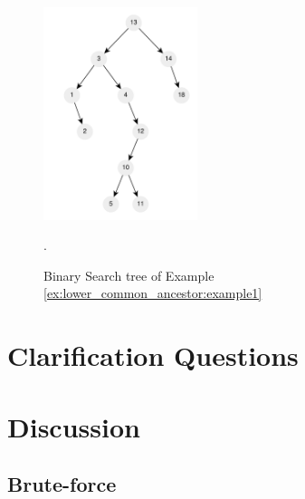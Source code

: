 \begin{figure}
	\centering
	\includegraphics[width=0.4\textwidth]{sources/lowest_common_ancestor/images/example1}
	\caption[Sample short cpation]{Binary Search tree of Example \ref{ex:lower_common_ancestor:example1}}.
	\label{fig:lowest_common_ancestor:example1}
\end{figure}

\section{Clarification Questions}

\begin{QandA}
	\item 
	\begin{answered}
		\textit{}
	\end{answered}
	
\end{QandA}

\section{Discussion}
\label{lowest_common_ancestor:sec:discussion}


\subsection{Brute-force}
\label{lowest_common_ancestor:sec:bruteforce}

\begin{minipage}{\linewidth}
	
\end{minipage}
